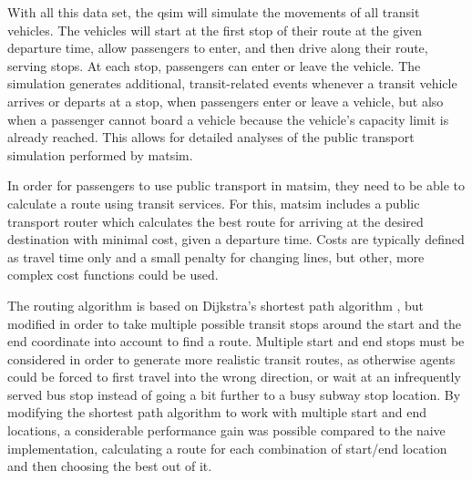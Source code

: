 With all this data set, the \gls{qsim} will simulate the movements of all
transit vehicles. The vehicles will start at the first stop of their route at the given
departure time, allow passengers to enter, and then drive along their route,
serving stops. At each stop, passengers can enter or leave the vehicle.
The simulation generates additional, transit-related events whenever a transit
vehicle arrives or departs at a stop, when passengers enter or leave a vehicle,
but also when a passenger cannot board a vehicle because the vehicle's capacity
limit is already reached. This allows for detailed analyses of the public transport
simulation performed by \gls{matsim}.

In order for passengers to use public transport in \gls{matsim}, they need to be able
to calculate a route using transit services. For this, \gls{matsim} includes a public
transport router which calculates the best route for arriving at the desired
destination with minimal cost, given a departure time. Costs are typically
defined as travel time only and a small penalty for changing lines, but other,
more complex cost functions could be used.

The routing algorithm is based on Dijkstra's shortest path algorithm
\citep{Dijkstra1959ShortestPath}, but modified in order to take
multiple possible transit stops around the start and the end coordinate
into account to find a route. Multiple start and end stops must be considered in
order to generate more realistic transit routes, as otherwise agents could
be forced to first travel into the wrong direction, or wait at an infrequently
served bus stop instead of going a bit further to a busy subway stop location.
By modifying the shortest path algorithm to work with multiple start and end
locations, a considerable performance gain was possible compared to the naive
implementation, calculating a route for each combination of start/end location
and then choosing the best out of it.

